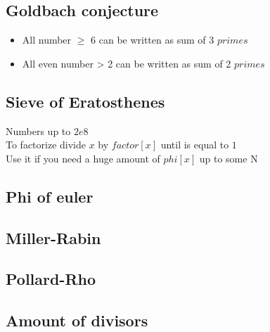 
\subsection{Goldbach conjecture}
\vspace{-5pt}
\begin{itemize}[noitemsep]
  \item All number $\geq$ 6 can be written as sum of 3 $primes$
  \item All even number > 2 can be written as sum of 2 $primes$
\end{itemize}
\vspace{-15pt}

\subsection{Sieve of Eratosthenes}
Numbers up to $2e8$ \\
To factorize divide $x$ by $factor[x]$ until is equal to $1$ \\
Use it if you need a huge amount of $phi[x]$ up to some N \\
\vspace{-15pt}

\subsection{Phi of euler}

\subsection{Miller-Rabin}

\subsection{Pollard-Rho}

\subsection{Amount of divisors}

